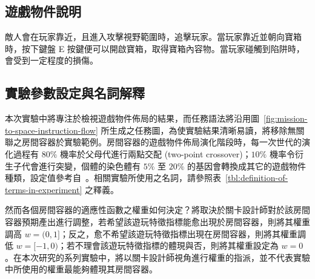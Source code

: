 \subsection{遊戲物件說明}
\label{ssec:experiment-gameobjects}

敵人會在玩家靠近，且進入攻擊視野範圍時，追擊玩家。當玩家靠近並朝向寶箱時，按下鍵盤 E 按鍵便可以開啟寶箱，取得寶箱內容物。當玩家碰觸到陷阱時，會受到一定程度的損傷。







\subsection{實驗參數設定與名詞解釋}
\label{ssec:experiment-parameters}

本次實驗中將專注於檢視遊戲物件佈局的結果，而任務語法將沿用圖~\ref{fig:mission-to-space-instruction-flow} 所生成之任務圖，為使實驗結果清晰易讀，將移除無關聯之房間容器於實驗範例。房間容器的遊戲物件佈局演化階段時，每一次世代的演化過程有 $80\%$ 機率於父母代進行兩點交配 (two-point crossover)；$10\%$ 機率令衍生子代會進行突變，個體的染色體有 $5\%$ 至 $20\%$ 的基因會轉換成其它的遊戲物件種類，設定值參考自~\cite{liapis2017multi}。相關實驗所使用之名詞，請參照表~\ref{tbl:definition-of-terms-in-experiment} 之釋義。

然而各個房間容器的適應性函數之權重如何決定？將取決於關卡設計師對於該房間容器預期產出進行調整，若希望該遊玩特徵指標能愈出現於房間容器，則將其權重調高 $w = (0, 1]$；反之，愈不希望該遊玩特徵指標出現在房間容器，則將其權重調低 $w = [-1, 0)$；若不理會該遊玩特徵指標的體現與否，則將其權重設定為 $w = 0$。在本次研究的系列實驗中，將以關卡設計師視角進行權重的指派，並不代表實驗中所使用的權重最能夠體現其房間容器。

